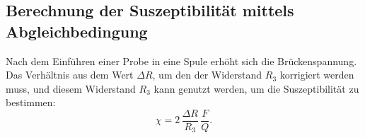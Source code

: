 \subsection{Berechnung der Suszeptibilität mittels Abgleichbedingung} %
Nach dem Einführen einer Probe in eine Spule erhöht sich die Brückenspannung.
Das Verhältnis aus dem Wert $\Delta R$, um den der Widerstand $R_3$ korrigiert werden
muss, und diesem Widerstand $R_3$ kann genutzt werden, um die Suszeptibilität zu 
bestimmen:
\begin{equation}
    \chi = 2 \, \frac{\Delta R}{R_3} \, \frac{F}{Q}.
    \label{eqn:chiexp2}
\end{equation}